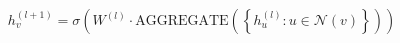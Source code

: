 \documentclass[preview]{standalone}
\begin{document}
\begin{align*}
h_v^{(l+1)} = \sigma \left( W^{(l)} \cdot \text{AGGREGATE} \left( \left\{ h_u^{(l)} : u \in \mathcal{N}(v) \right\} \right) \right)
\end{align*}
\end{document}
